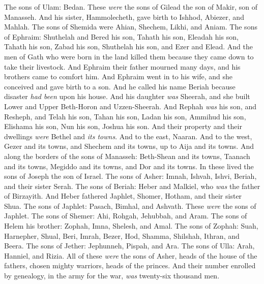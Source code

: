 \begin{biblechapter}
\verse The sons of Ulam: Bedan. These \textit{were} the sons of Gilead the son of Makir, son of Manasseh.
\verse And his sister, Hammolecheth, gave birth to Ishhod, Abiezer, and Mahlah.
\verse The sons of Shemida were Ahian, Shechem, Likhi, and Aniam.
 The sons of Ephraim: Shuthelah and Bered his son, Tahath his son, Eleadah his son, Tahath his son,
\verse Zabad his son, Shuthelah his son, and Ezer and Elead. And the men of Gath who were born in the land killed them because they came down to take their livestock.
\verse And Ephraim their father mourned many days, and his brothers came to comfort him.
\verse And Ephraim went in to his wife, and she conceived and gave birth to a son. And he called his name Beriah because disaster \textit{had been} upon his house.
\verse And his daughter \textit{was} Sheerah, and she built Lower and Upper Beth-Horon and Uzzen-Sheerah.
\verse And Rephah \textit{was} his son, and Resheph, and Telah his son, Tahan his son,
\verse Ladan his son, Ammihud his son, Elishama his son,
\verse Nun his son, Joshua his son.
\verse And their property and their dwellings \textit{were} Bethel and \textit{its towns}. And to the east, Naaran. And to the west, Gezer and its towns, and Shechem and its towns, up to Aija and its towns.
\verse And along the borders of the sons of Manasseh: Beth-Shean and its towns, Taanach and its towns, Megiddo and its towns, and Dor and its towns. In these lived the sons of Joseph the son of Israel.
 The sons of Asher: Imnah, Ishvah, Ishvi, Beriah, and their sister Serah.
\verse The sons of Beriah: Heber and Malkiel, who \textit{was} the father of Birzayith.
\verse And Heber fathered Japhlet, Shomer, Hotham, and their sister Shua.
\verse The sons of Japhlet: Pasach, Bimhal, and Ashvath. These \textit{were} the sons of Japhlet.
\verse The sons of Shemer: Ahi, Rohgah, Jehubbah, and Aram.
\verse The sons of Helem his brother: Zophah, Imna, Shelesh, and Amal.
\verse The sons of Zophah: Suah, Harnepher, Shual, Beri, Imrah,
\verse Bezer, Hod, Shamma, Shilshah, Ithran, and Beera.
\verse The sons of Jether: Jephunneh, Pispah, and Ara.
\verse The sons of Ulla: Arah, Hanniel, and Rizia.
\verse All of these \textit{were} the sons of Asher, heads of the house of the fathers, chosen mighty warriors, heads of the princes. And their number enrolled by genealogy, in the army for the war, \textit{was} twenty-six thousand men.
\end{biblechapter}


